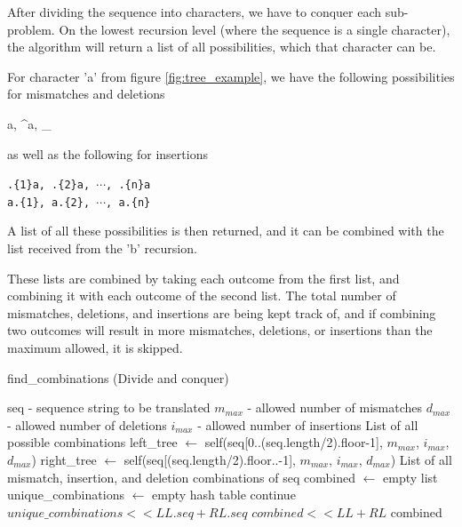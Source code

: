 \documentclass[12pt]{article}
\theoremstyle{definition}
\newcommand*\Let[2]{\State #1 $\gets$ #2}
\newcommand*\Returns[1]{\State \Return #1}
\newcommand*\Append[2]{\State $#1 << #2$}
\begin{document}
After dividing the sequence into characters, we have to conquer each sub-problem. On the lowest recursion level (where the sequence is a single character), the algorithm will return a list of all possibilities, which that character can be.

\begin{example}[label=example:possibilities]
For character 'a' from figure \ref{fig:tree_example}, we have the following possibilities for mismatches and deletions

\begin{center}
	{a, \^{}a, \_}
\end{center}

as well as the following for insertions

\begin{center}
	\texttt{.\{1\}a, .\{2\}a, $\cdots$, .\{n\}a} \\
	\texttt{a.\{1\}, a.\{2\}, $\cdots$, a.\{n\}}
\end{center}

A list of all these possibilities is then returned, and it can be combined with the list received from the 'b' recursion.
\end{example}

These lists are combined by taking each outcome from the first list, and combining it with each outcome of the second list. The total number of mismatches, deletions, and insertions are being kept track of, and if combining two outcomes will result in more mismatches, deletions, or insertions than the maximum allowed, it is skipped.

\begin{spacing}{0.8}
\begin{algorithm}[H]
	\caption{find\_combinations (Divide and conquer)}
	\label{alg:divideandconquer}
  	\begin{algorithmic}[1]
    		\Require
    			\Statex seq - sequence string to be translated
    			\Statex $m_{max}$ - allowed number of mismatches
    			\Statex $d_{max}$ - allowed number of deletions
    			\Statex $i_{max}$ - allowed number of insertions
    		\Ensure
    			\Statex List of all possible combinations
		\Statex
    			\Let{left\_tree}{self(seq[0..(seq.length/2).floor-1], $m_{max}$, $i_{max}$, $d_{max}$)}
    			\Let{right\_tree}{self(seq[(seq.length/2).floor..-1], $m_{max}$, $i_{max}$, $d_{max}$)}
    		\Else
    			\Returns{List of all mismatch, insertion, and deletion combinations of seq}
    		\EndIf
    		\State
    		\Let{combined}{empty list}
    		\Let{unique\_combinations}{empty hash table}
    		 
    			 
    					\State continue
    				\EndIf
    					\Append{unique\_combinations}{LL.seq + RL.seq}
    					\Append{combined}{LL + RL}
    				\EndIf
    			\EndFor
    		\EndFor
    		\Returns{combined}
  	\end{algorithmic}
\end{algorithm}
\end{spacing}
\end{document}
